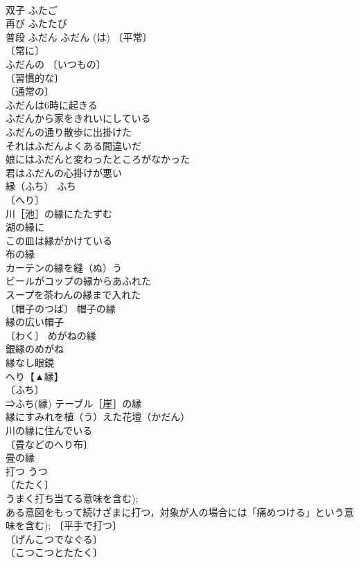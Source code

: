 \documentclass[8pt]{extreport}
\begin{document}
\begin{CJK}{UTF8}{min}
\\	双子	ふたご	
\\	再び	ふたたび	
\\	普段	ふだん	ふだん (は) 〔平常〕
\\	〔常に〕
\\	ふだんの 〔いつもの〕
\\	〔習慣的な〕
\\	〔通常の〕
\\	ふだんは6時に起きる 
\\	ふだんから家をきれいにしている 
\\	ふだんの通り散歩に出掛けた 
\\	それはふだんよくある間違いだ 
\\	娘にはふだんと変わったところがなかった 
\\	君はふだんの心掛けが悪い 
\\	縁（ふち）	ふち	
\\	〔へり〕
\\	川［池］の縁にたたずむ 
\\	湖の縁に 
\\	この皿は縁がかけている 
\\	布の縁 
\\	カーテンの縁を縫（ぬ）う 
\\	ビールがコップの縁からあふれた 
\\	スープを茶わんの縁まで入れた 
\\	〔帽子のつば〕 帽子の縁 
\\	縁の広い帽子 
\\	〔わく〕 めがねの縁 
\\	銀縁のめがね 
\\	縁なし眼鏡 
\\	へり【▲縁】 
\\	〔ふち〕
\\	⇒ふち(縁) テーブル［崖］の縁 
\\	縁にすみれを植（う）えた花壇（かだん） 
\\	川の縁に住んでいる 
\\	〔畳などのへり布〕
\\	畳の縁 
\\	打つ	うつ	
\\	〔たたく〕
\\	うまく打ち当てる意味を含む); 
\\	ある意図をもって続けざまに打つ，対象が人の場合には「痛めつける」という意味を含む); 〔平手で打つ〕
\\	〔げんこつでなぐる〕
\\	〔こつこつとたたく〕

\end{CJK}
\end{document}
